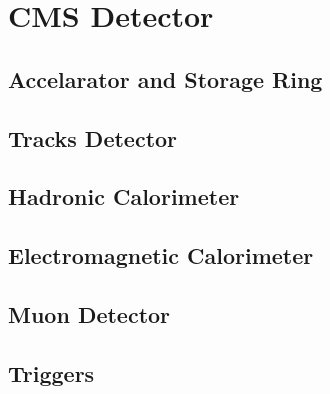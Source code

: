 \chapter{CMS Detector}

\section{Accelarator and Storage Ring}

\section{Tracks Detector}

\section{Hadronic Calorimeter}

\section{Electromagnetic Calorimeter}

\section{Muon Detector}

\section{Triggers}